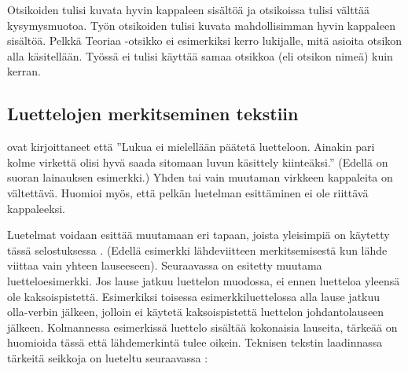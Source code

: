 \documentclass{LUT_pohja}[2016/03/09 LUT Dippa Pohja]
\begin{document}
Otsikoiden tulisi kuvata  hyvin kappaleen  sisältöä  ja  otsikoissa tulisi  välttää 
kysymysmuotoa. Työn otsikoiden tulisi kuvata mahdollisimman hyvin kappaleen sisältöä. 
Pelkkä Teoriaa -otsikko ei esimerkiksi kerro lukijalle, mitä asioita otsikon alla käsitellään. Työssä ei tulisi käyttää samaa otsikkoa (eli otsikon nimeä) kuin kerran. 

\subsection{Luettelojen merkitseminen tekstiin}
\citet[s. 110]{Hirsjarvi05} ovat kirjoittaneet että ”Lukua ei mielellään päätetä luetteloon. Ainakin pari kolme virkettä olisi hyvä saada sitomaan luvun käsittely kiinteäksi.” (Edellä on suoran lainauksen esimerkki.) Yhden tai vain muutaman virkkeen kappaleita on vältettävä. Huomioi myös, että pelkän luetelman esittäminen ei ole riittävä kappaleeksi.\par

Luetelmat voidaan esittää muutamaan eri tapaan, joista yleisimpiä on käytetty tässä 
selostuksessa \citep[s.23]{Leino00}. (Edellä esimerkki lähdeviitteen 
merkitsemisestä kun lähde viittaa vain yhteen lauseeseen). Seuraavassa on esitetty 
muutama luetteloesimerkki. Jos lause jatkuu luettelon muodossa, ei ennen luetteloa yleensä ole kaksoispistettä. Esimerkiksi toisessa esimerkkiluettelossa alla lause jatkuu olla-verbin jälkeen, jolloin ei käytetä kaksoispistettä luettelon johdantolauseen jälkeen. Kolmannessa esimerkissä luettelo sisältää kokonaisia lauseita, tärkeää on huomioida tässä että lähdemerkintä tulee oikein. Teknisen tekstin laadinnassa tärkeitä seikkoja on lueteltu seuraavassa \citep[s.20]{Leino00}:
\end{document}
